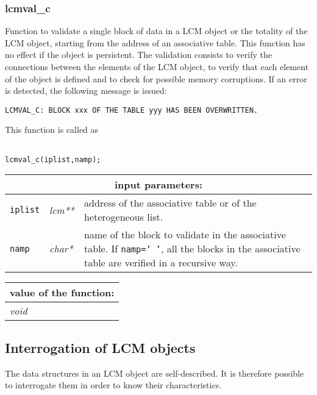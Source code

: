 \subsubsection{lcmval\_c}

Function to validate a single block of data in a LCM object or the totality of the LCM object,
starting from the address of an associative table. This function has no effect if the object is
persistent. The validation consists to verify the connections between the elements of the LCM
object, to verify that each element of the object is defined and to check for possible memory corruptions.
If an error is detected, the following message is issued:

\begin{verbatim}
LCMVAL_C: BLOCK xxx OF THE TABLE yyy HAS BEEN OVERWRITTEN.
\end{verbatim}

This function is called as

\begin{verbatim}

lcmval_c(iplist,namp);
\end{verbatim}

\noindent
\begin{tabular}{|p{1.5cm}|p{2cm}|p{11cm}|}
\hline
\multicolumn{3}{|c|}{\bf input parameters:} \\
\hline
{\tt iplist} & {\it lcm**} & address of the associative table or of the heterogeneous list. \\
\hline
{\tt namp} & {\it char*} & name of the block to validate in the associative table. 
If {\tt namp='~'}, all the blocks in the associative table are verified in a recursive way. \\
\hline
\end{tabular}

\vskip 0.8cm

\noindent
\begin{tabular}{|p{4.0cm}|p{11cm}|}
\hline
\multicolumn{2}{|c|}{\bf value of the function:} \\
\hline
{\it void} &  \\
\hline
\end{tabular}

\vskip 0.8cm

\subsection{Interrogation of LCM objects}

The data structures in an LCM object are self-described. It is therefore possible to
interrogate them in order to know their characteristics.

